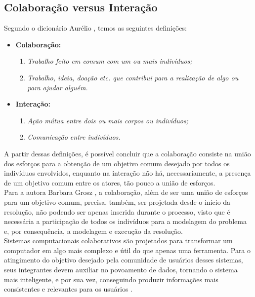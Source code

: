 \subsection{Colaboração versus Interação}
Segundo o dicionário Aurélio \cite{aurelio}, temos as seguintes definições:%
\begin{itemize}
  \item \textbf{Colaboração:}
  \begin{enumerate}
    \item \textit{Trabalho feito em comum com um ou mais indivíduos;}
    \item \textit{Trabalho, ideia, doação etc. que contribui para a realização de algo ou para ajudar alguém.}
  \end{enumerate}
\newpage
  \item \textbf{Interação:}
  \begin{enumerate}
    \item \textit{Ação mútua entre dois ou mais corpos ou indivíduos;}
    \item \textit{Comunicação entre indivíduos.}
  \end{enumerate}
\end{itemize}
 \null
\quad A partir dessas definições, é possível concluir que a colaboração consiste na união dos esforços
para a obtenção de um objetivo comum desejado por todos os indivíduos envolvidos, enquanto na interação
não há, necessariamente, a presença de um objetivo comum entre os atores, tão pouco a união de esforços. \\ \null \quad
Para a autora Barbara Grosz \cite{cbarbara}, a colaboração, além de ser uma união de esforços para um objetivo comum,
precisa, também, ser projetada desde o início da resolução, não podendo ser apenas inserida durante o processo, visto que é
necessária a participação de todos os indivíduos para a modelagem do problema e, por consequência, a modelagem e execução da resolução.
\\
\null \quad Sistemas computacionais colaborativos são projetados para transformar um computador em algo mais complexo e útil do que apenas uma ferramenta.
Para o atingimento do objetivo desejado pela comunidade de usuários desses sistemas, seus integrantes devem auxiliar no povoamento de dados,
tornando o sistema mais inteligente, e por sua vez, conseguindo produzir informações mais consistentes e relevantes para os usuários \cite{cbarbara}.

